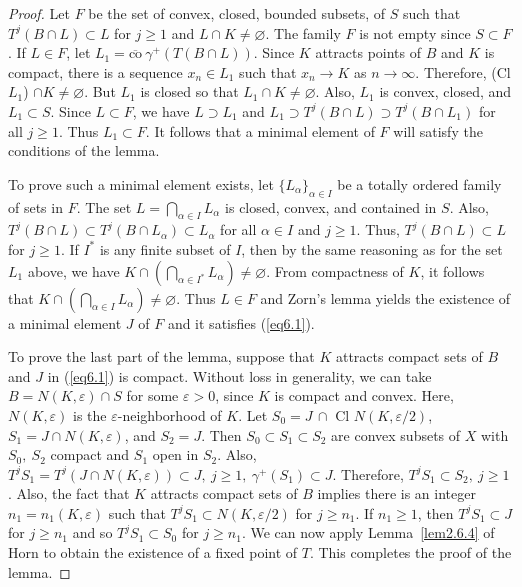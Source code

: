 \documentclass{surv-l}
\theoremstyle{plain}
\theoremstyle{definition}
\numberwithin{equation}{section}
\numberwithin{figure}{chapter}
\begin{document}
\begin{proof} Let $F$ be the set of convex, closed, bounded subsets, of $S$ such that $T^{j}(B\cap L)\subset L$ for $j\geq 1$ and $ L\cap K\neq\varnothing$. The family $F$ is not empty since $S\subset F$. If $L\in F$, let $L_{1}=\overline{\mathrm{co}}\ \gamma^{+}(T(B\cap L))$. Since $K$ attracts points of $B$ and $K$ is compact, there is a sequence $x_{n}\in L_{1}$ such that $x_{n}\rightarrow K$ as $ n\rightarrow\infty$. Therefore, (Cl $L_{1}$) $\cap K\neq\varnothing$. But $L_{1}$ is closed so that $ L_{1}\cap K\neq\varnothing$. Also, $L_{1}$ is convex, closed, and $L_{1}\subset S$. Since $L\subset F$, we have $L\supset L_{1}$ and $L_{1}\supset T^{j}(B\cap L)\supset T^{j}(B\cap L_{1})$ for all $j\geq 1$. Thus $L_{1}\subset F$. It follows that a minimal element of $F$ will satisfy the conditions of the lemma.

To prove such a minimal element exists, let $\{L_{\alpha}\}_{\alpha\in I}$ be a totally ordered family of sets in $F$. The set $L=\bigcap_{\alpha\in I}L_{\alpha}$ is closed, convex, and contained in $S$. Also, $T^{j}(B\cap L)\subset T^{j}(B\cap L_{\alpha})\subset L_{\alpha}$ for all $\alpha\in I$ and $j\geq 1$. Thus, $T^{j}(B\cap L)\subset L$ for $j\geq 1$. If $I^{\ast}$ is any finite subset of $I$, then by the same reasoning as for the set $L_{1}$ above, we have $K\cap(\bigcap_{\alpha\in I^*}L_{\alpha})\neq\varnothing$. From compactness of $K$, it follows that $K\cap(\bigcap_{\alpha\in I}L_{\alpha})\neq\varnothing$. Thus $L\in F$ and Zorn's lemma yields the existence of a minimal element $J$ of $F$ and it satisfies (\ref{eq6.1}).

To prove the last part of the lemma, suppose that $K$ attracts compact sets of $B$ and $J$ in (\ref{eq6.1}) is compact. Without loss in generality, we can take $B=N(K, \varepsilon)\cap S$ for some $\varepsilon>0$, since $K$ is compact and convex. Here, $N(K, \varepsilon)$ is the $\varepsilon$-neighborhood of $K$. Let $S_{0}=J\,\cap$ Cl $N(K, \varepsilon/2)$, $S_{1}=J\cap N(K, \varepsilon)$, and $S_{2}=J$. Then $S_{0}\subset S_{1}\subset S_{2}$ are convex subsets of $X$ with $S_{0},\ S_{2}$ compact and $S_{1}$ open in $S_{2}$. Also, $T^{j}S_{1}=T^{j}(J\cap N(K, \varepsilon))\subset J,\ j\geq 1,\ \gamma^{+}(S_{1})\subset J$. Therefore, $T^{j}S_{1}\subset S_{2},\ j\geq 1$. Also, the fact that $K$ attracts compact sets of $B$ implies there is an integer $n_{1}=n_{1}(K, \varepsilon)$ such that $T^{j}S_{1}\subset N(K, \varepsilon/2)$ for $j\geq n_{1}$. If $n_{1}\geq 1$, then $T^{j}S_{1}\subset J$ for $j\geq n_{1}$ and so $T^{j}S_{1}\subset S_{0}$ for $j\geq n_{1}$. We can now apply Lemma~\ref{lem2.6.4} of Horn to obtain the existence of a fixed point of $T$. This completes the proof of the lemma.
\end{proof}
\end{document}
